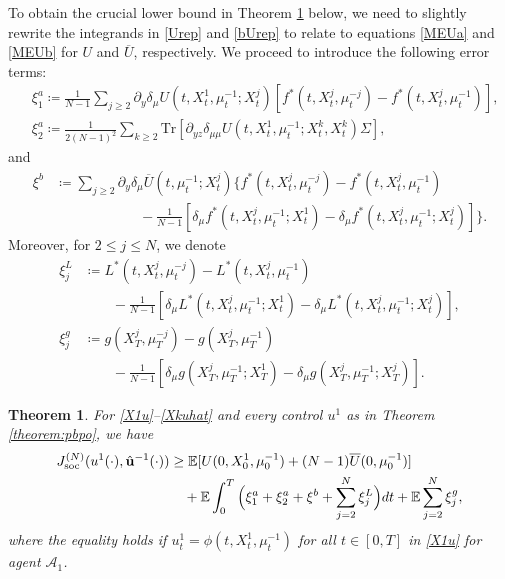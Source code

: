 \documentclass{amsart}
\newtheorem{theorem}{Theorem}[section]
\theoremstyle{definition}
\theoremstyle{remark}
\def\EE{{\mathbb E}}
\numberwithin{equation}{section}
\begin{document}
To obtain the crucial lower bound in  Theorem \ref{theorem:Jlb} below, we need to slightly rewrite the integrands in \eqref{Urep} and \eqref{bUrep} to relate to  equations \eqref{MEUa} and \eqref{MEUb} for $U$ and $\overline U$, respectively.
We proceed to introduce the following error terms:
\begin{align*}
&\xi^a_1\coloneqq \frac{1}{N-1}\sum_{j\ge 2} \partial_{y}\delta_\mu U(t, X^1_t,\mu_t^{-1}; X^j_t)[f^*(t, X_t^j, \mu_t^{-j}) - f^*(t, X_t^j, \mu_t^{-1})],\\
& \xi_2^a\coloneqq
 \frac{1}{2(N-1)^2}\sum_{k\ge 2  }\mbox{Tr} [\partial_{yz}
\delta_{\mu\mu}
U(t, X^1_t,\mu_t^{-1};X_t^k, X^k_t)\Sigma],
\end{align*}
and
\begin{align*}
 \xi^b&\coloneqq  \sum_{j\ge 2} \partial_{y}\delta_\mu \overline U(t, \mu_t^{-1}; X^j_t)\Big\{f^*(t, X_t^j, \mu_t^{-j})- f^*(t, X_t^j, \mu_t^{-1})\\
  & \qquad \qquad\qquad - \frac{1}{N-1} [   \delta_\mu f^*(t, X_t^j, \mu_t^{-1}; X_t^1) - \delta_\mu f^*(t, X_t^j, \mu_t^{-1}; X_t^j)] \Big\}.
\end{align*}
Moreover,  for $2\le j\le N$, we denote
\begin{align*}
\xi^L_j&\coloneqq
L^*(t, X_t^j, \mu_t^{-j})- L^*(t, X^j_t, \mu_t^{-1})\\
&\qquad - \frac{1}{N-1}[ \delta_\mu L^*(t, X^j_t, \mu^{-1}_t; X_t^1)-\delta_\mu L^*(t, X^j_t, \mu^{-1}_t; X_t^j)],\\
\xi^g_j&\coloneqq
g(X_T^j, \mu_T^{-j})- g(X_T^j, \mu_T^{-1})\\
&\qquad- \frac{1}{N-1}[ \delta_\mu g( X^j_T, \mu^{-1}_T; X_T^1)-\delta_\mu g( X^j_T, \mu^{-1}_T; X_T^j)].
 \end{align*}




\begin{theorem}  \label{theorem:Jlb}
For \eqref{X1u}--\eqref{Xkuhat} and every control $u^1$ as in Theorem \ref{theorem:pbpo},
we  have
\begin{align}
J_{\rm soc}^{(N)}(u^1(\cdot), \hat {\mathbf u}^{-1}(\cdot))&\ge \EE[U(0, X_0^1, \mu_0^{-1}) +(N-1) \overline U(0, \mu_0^{-1} ) ]\\
&\quad+\EE \int_0^T \Big( \xi_1^a +\xi_2^a+ \xi^b+ \sum_{j=2}^N \xi^L_j\Big) dt  +\EE \sum_{j=2}^N \xi_j^g,\nonumber
\end{align}
where the equality holds if $u_t^1=\phi(t, X_t^1, \mu_t^{-1})$ for all $t\in [0,T]$ in \eqref{X1u} for agent ${\mathcal A}_1$.
\end{theorem}
\end{document}
